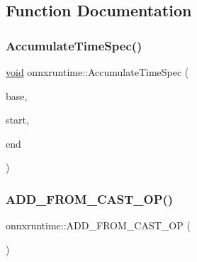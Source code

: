 \subsection{Function Documentation}
\mbox{\label{namespaceonnxruntime_a686b4907aee768270108066f37700c01}} 
\subsubsection{\texorpdfstring{Accumulate\+Time\+Spec()}{AccumulateTimeSpec()}}
{\footnotesize\ttfamily \mbox{\hyperlink{mlasi_8h_a88f941d423cb2a819b70a1358982b1a6}{void}} onnxruntime\+::\+Accumulate\+Time\+Spec (\begin{DoxyParamCaption}\item[{\mbox{\hyperlink{namespaceonnxruntime_ab69d87fbee3d0a327786f60db7c166e7}{T\+I\+M\+E\+\_\+\+S\+P\+EC}} $\ast$}]{base,  }\item[{\mbox{\hyperlink{namespaceonnxruntime_ab69d87fbee3d0a327786f60db7c166e7}{T\+I\+M\+E\+\_\+\+S\+P\+EC}} $\ast$}]{start,  }\item[{\mbox{\hyperlink{namespaceonnxruntime_ab69d87fbee3d0a327786f60db7c166e7}{T\+I\+M\+E\+\_\+\+S\+P\+EC}} $\ast$}]{end }\end{DoxyParamCaption})}

\mbox{\label{namespaceonnxruntime_a547f0a8117e6245556dc680337891468}} 
\subsubsection{\texorpdfstring{A\+D\+D\+\_\+\+F\+R\+O\+M\+\_\+\+C\+A\+S\+T\+\_\+\+O\+P()}{ADD\_FROM\_CAST\_OP()}\hspace{0.1cm}{\footnotesize\ttfamily [1/11]}}
{\footnotesize\ttfamily onnxruntime\+::\+A\+D\+D\+\_\+\+F\+R\+O\+M\+\_\+\+C\+A\+S\+T\+\_\+\+OP (\begin{DoxyParamCaption}\item[{uint8\+\_\+t}]{ }\end{DoxyParamCaption})}

